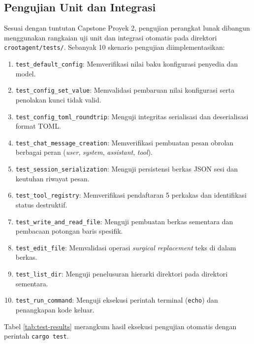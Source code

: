\subsection{Pengujian Unit dan Integrasi}
Sesuai dengan tuntutan Capstone Proyek 2, pengujian perangkat lunak dibangun menggunakan rangkaian uji unit dan integrasi otomatis pada direktori \texttt{crootagent/tests/}. Sebanyak 10 skenario pengujian diimplementasikan:

\begin{enumerate}
    \item \texttt{test\_default\_config}: Memverifikasi nilai baku konfigurasi penyedia dan model.
    \item \texttt{test\_config\_set\_value}: Memvalidasi pembaruan nilai konfigurasi serta penolakan kunci tidak valid.
    \item \texttt{test\_config\_toml\_roundtrip}: Menguji integritas serialisasi dan deserialisasi format TOML.
    \item \texttt{test\_chat\_message\_creation}: Memverifikasi pembuatan pesan obrolan berbagai peran (\textit{user}, \textit{system}, \textit{assistant}, \textit{tool}).
    \item \texttt{test\_session\_serialization}: Menguji persistensi berkas JSON sesi dan keutuhan riwayat pesan.
    \item \texttt{test\_tool\_registry}: Memverifikasi pendaftaran 5 perkakas dan identifikasi status destruktif.
    \item \texttt{test\_write\_and_read\_file}: Menguji pembuatan berkas sementara dan pembacaan potongan baris spesifik.
    \item \texttt{test\_edit\_file}: Memvalidasi operasi \textit{surgical replacement} teks di dalam berkas.
    \item \texttt{test\_list\_dir}: Menguji penelusuran hierarki direktori pada direktori sementara.
    \item \texttt{test\_run\_command}: Menguji eksekusi perintah terminal (\texttt{echo}) dan penangkapan kode keluar.
\end{enumerate}

Tabel \ref{tab:test-results} merangkum hasil eksekusi pengujian otomatis dengan perintah \texttt{cargo test}.

